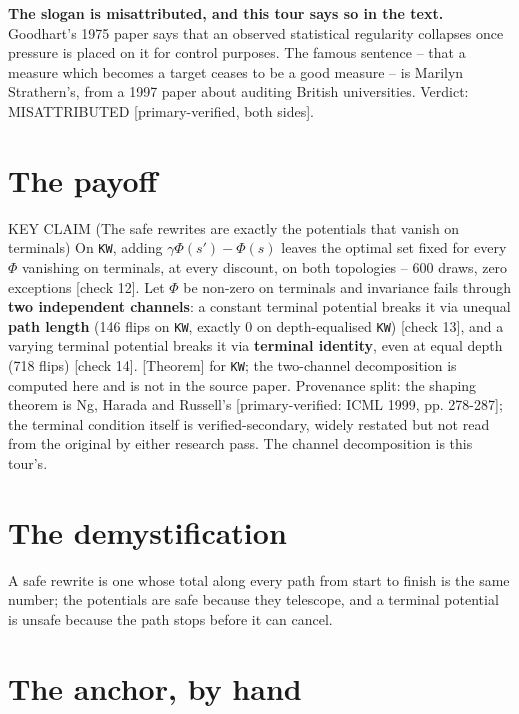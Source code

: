 \textbf{The slogan is misattributed, and this tour says so in the text.} Goodhart's 1975 paper says that an observed statistical regularity collapses once pressure is placed on it for control purposes. The famous sentence -- that a measure which becomes a target ceases to be a good measure -- is Marilyn Strathern's, from a 1997 paper about auditing British universities. Verdict: MISATTRIBUTED [primary-verified, both sides].

\section*{The payoff}

\begin{whybox}{KEY CLAIM (The safe rewrites are exactly the potentials that vanish on terminals)}
On \texttt{KW}, adding $\gamma\Phi(s') - \Phi(s)$ leaves the optimal set fixed for every $\Phi$ vanishing on terminals, at every discount, on both topologies -- 600 draws, zero exceptions [check 12]. Let $\Phi$ be non-zero on terminals and invariance fails through \textbf{two independent channels}: a constant terminal potential breaks it via unequal \textbf{path length} (146 flips on \texttt{KW}, exactly 0 on depth-equalised \texttt{KW}) [check 13], and a varying terminal potential breaks it via \textbf{terminal identity}, even at equal depth (718 flips) [check 14]. [Theorem] for \texttt{KW}; the two-channel decomposition is computed here and is not in the source paper.
Provenance split: the shaping theorem is Ng, Harada and Russell's [primary-verified: ICML 1999, pp. 278-287]; the terminal condition itself is verified-secondary, widely restated but not read from the original by either research pass. The channel decomposition is this tour's.
\end{whybox}

\section*{The demystification}

\begin{whyboxnt}
A safe rewrite is one whose total along every path from start to finish is the same number; the potentials are safe because they telescope, and a terminal potential is unsafe because the path stops before it can cancel.
\end{whyboxnt}

\section*{The anchor, by hand}

